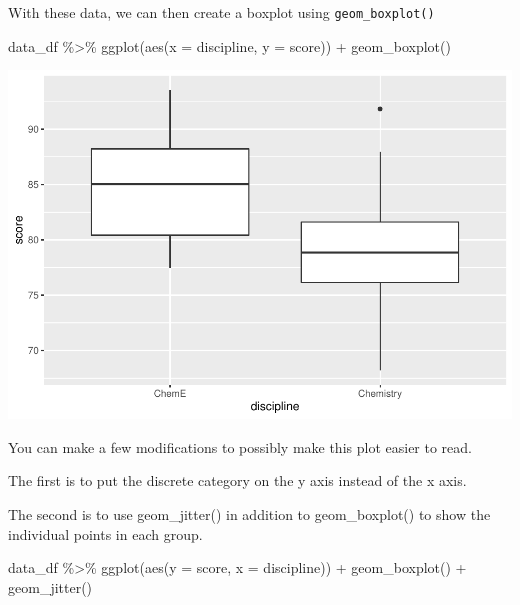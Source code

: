\documentclass[
]{book}
\newenvironment{Shaded}{\begin{snugshade}}{\end{snugshade}}
\newcommand{\AttributeTok}[1]{\textcolor[rgb]{0.77,0.63,0.00}{#1}}
\newcommand{\FunctionTok}[1]{\textcolor[rgb]{0.00,0.00,0.00}{#1}}
\newcommand{\NormalTok}[1]{#1}
\newcommand{\SpecialCharTok}[1]{\textcolor[rgb]{0.00,0.00,0.00}{#1}}
\begin{document}
With these data, we can then create a boxplot using \texttt{geom\_boxplot()}

\begin{Shaded}
\begin{Highlighting}[]
\NormalTok{data\_df }\SpecialCharTok{\%\textgreater{}\%} 
  \FunctionTok{ggplot}\NormalTok{(}\FunctionTok{aes}\NormalTok{(}\AttributeTok{x =}\NormalTok{ discipline, }\AttributeTok{y =}\NormalTok{ score)) }\SpecialCharTok{+}
  \FunctionTok{geom\_boxplot}\NormalTok{()}
\end{Highlighting}
\end{Shaded}

\includegraphics{test_course_notes_files/figure-latex/unnamed-chunk-38-1.pdf}

You can make a few modifications to possibly make this plot easier to read.

The first is to put the discrete category on the y axis instead of the x axis.

The second is to use geom\_jitter() in addition to geom\_boxplot() to show the individual points in each group.

\begin{Shaded}
\begin{Highlighting}[]
\NormalTok{data\_df }\SpecialCharTok{\%\textgreater{}\%} 
  \FunctionTok{ggplot}\NormalTok{(}\FunctionTok{aes}\NormalTok{(}\AttributeTok{y =}\NormalTok{ score, }\AttributeTok{x =}\NormalTok{ discipline)) }\SpecialCharTok{+}
  \FunctionTok{geom\_boxplot}\NormalTok{() }\SpecialCharTok{+}
  \FunctionTok{geom\_jitter}\NormalTok{()}
\end{Highlighting}
\end{Shaded}
\end{document}

